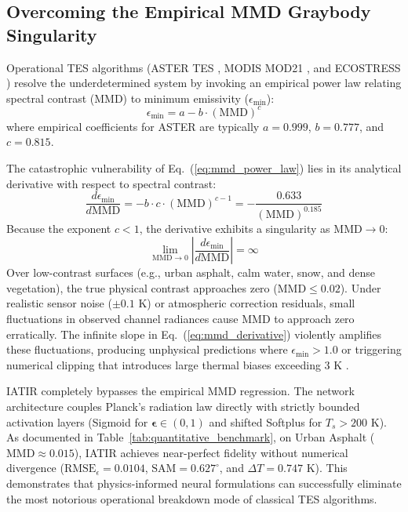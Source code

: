 \documentclass[journal]{IEEEtran}
\begin{document}
\subsection{Overcoming the Empirical MMD Graybody Singularity}
Operational TES algorithms (ASTER TES \cite{gillespie1998temperature}, MODIS MOD21 \cite{hulley2015mod21}, and ECOSTRESS \cite{hulley2018ecostress}) resolve the underdetermined system by invoking an empirical power law relating spectral contrast (MMD) to minimum emissivity ($\epsilon_{\min}$):
\begin{equation}
\epsilon_{\min} = a - b \cdot (\text{MMD})^c
\label{eq:mmd_power_law}
\end{equation}
where empirical coefficients for ASTER are typically $a = 0.999$, $b = 0.777$, and $c = 0.815$.

The catastrophic vulnerability of Eq.~(\ref{eq:mmd_power_law}) lies in its analytical derivative with respect to spectral contrast:
\begin{equation}
\frac{d\epsilon_{\min}}{d\text{MMD}} = -b \cdot c \cdot (\text{MMD})^{c-1} = -\frac{0.633}{(\text{MMD})^{0.185}}
\label{eq:mmd_derivative}
\end{equation}
Because the exponent $c < 1$, the derivative exhibits a singularity as $\text{MMD} \to 0$:
\begin{equation}
\lim_{\text{MMD} \to 0} \left| \frac{d\epsilon_{\min}}{d\text{MMD}} \right| = \infty
\end{equation}
Over low-contrast surfaces (e.g., urban asphalt, calm water, snow, and dense vegetation), the true physical contrast approaches zero ($\text{MMD} \le 0.02$). Under realistic sensor noise ($\pm 0.1\text{ K}$) or atmospheric correction residuals, small fluctuations in observed channel radiances cause $\text{MMD}$ to approach zero erratically. The infinite slope in Eq.~(\ref{eq:mmd_derivative}) violently amplifies these fluctuations, producing unphysical predictions where $\epsilon_{\min} > 1.0$ or triggering numerical clipping that introduces large thermal biases exceeding $3\text{ K}$ \cite{perezplanells2017retrieval}.

IATIR completely bypasses the empirical MMD regression. The network architecture couples Planck's radiation law directly with strictly bounded activation layers (Sigmoid for $\bm{\epsilon} \in (0, 1)$ and shifted Softplus for $T_s > 200\text{ K}$). As documented in Table~\ref{tab:quantitative_benchmark}, on Urban Asphalt ($\text{MMD} \approx 0.015$), IATIR achieves near-perfect fidelity without numerical divergence ($\text{RMSE}_\epsilon = 0.0104$, $\text{SAM} = 0.627^\circ$, and $\Delta T = 0.747\text{ K}$).
This demonstrates that physics-informed neural formulations can successfully eliminate the most notorious operational breakdown mode of classical TES algorithms.
\end{document}
